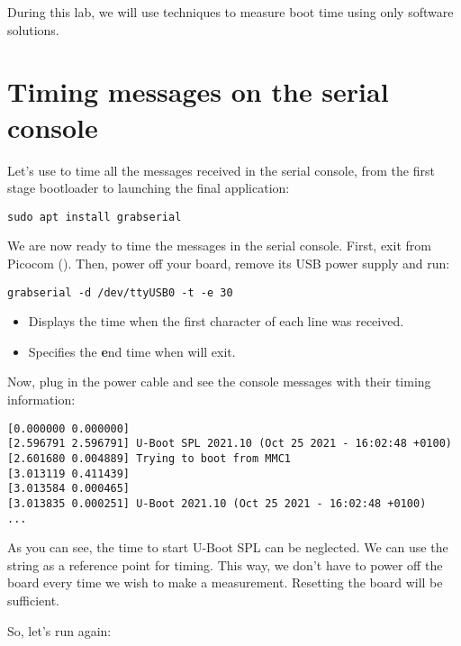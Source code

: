 
During this lab, we will use techniques to measure boot time using only
software solutions.

\section{Timing messages on the serial console}

Let's use  to time all the messages received in the
serial console, from the first stage bootloader to launching the final
application:

\begin{verbatim}
sudo apt install grabserial
\end{verbatim}

We are now ready to time the messages in the serial console. First, exit
from Picocom (\code{[Ctrl][a] [Ctrl][x]}). Then, power off your board,
remove its USB power supply and run:

\begin{verbatim}
grabserial -d /dev/ttyUSB0 -t -e 30
\end{verbatim}

\begin{itemize}
\item {} Displays the time when the first character of each line
was received.
\item {} Specifies the {\bf e}nd time when 
will exit.
\end{itemize}

Now, plug in the power cable and see the console messages with their
timing information:

\begin{verbatim}
[0.000000 0.000000]
[2.596791 2.596791] U-Boot SPL 2021.10 (Oct 25 2021 - 16:02:48 +0100)
[2.601680 0.004889] Trying to boot from MMC1
[3.013119 0.411439]
[3.013584 0.000465]
[3.013835 0.000251] U-Boot 2021.10 (Oct 25 2021 - 16:02:48 +0100)
...
\end{verbatim}

As you can see, the time to start U-Boot SPL can be neglected. We can
use the  string as a reference point for timing. This way,
we don't have to power off the board every time we wish to make a
measurement. Resetting the board will be sufficient.

So, let's run  again:

